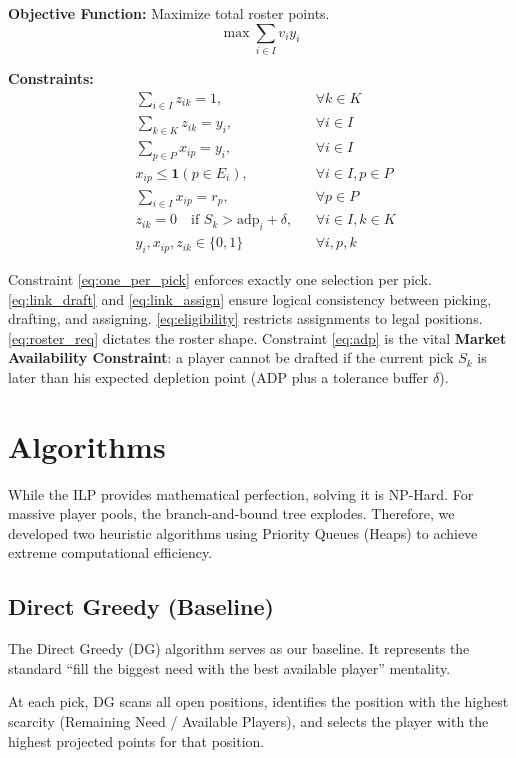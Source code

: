 \documentclass[11pt,a4paper]{article}
\begin{document}
\textbf{Objective Function:} Maximize total roster points.
\[
\max \sum_{i \in I} v_i y_i
\]

\textbf{Constraints:}
\begin{align}
& \sum_{i \in I} z_{ik} = 1, && \forall k \in K \label{eq:one_per_pick} \\
& \sum_{k \in K} z_{ik} = y_i, && \forall i \in I \label{eq:link_draft} \\
& \sum_{p \in P} x_{ip} = y_i, && \forall i \in I \label{eq:link_assign} \\
& x_{ip} \le \mathbf{1}(p \in E_i), && \forall i \in I, p \in P \label{eq:eligibility} \\
& \sum_{i \in I} x_{ip} = r_p, && \forall p \in P \label{eq:roster_req} \\
& z_{ik} = 0 \quad \text{if } S_k > \text{adp}_i + \delta, && \forall i \in I, k \in K \label{eq:adp} \\
& y_i, x_{ip}, z_{ik} \in \{0,1\} && \forall i, p, k
\end{align}

Constraint \eqref{eq:one_per_pick} enforces exactly one selection per pick. \eqref{eq:link_draft} and \eqref{eq:link_assign} ensure logical consistency between picking, drafting, and assigning. \eqref{eq:eligibility} restricts assignments to legal positions. \eqref{eq:roster_req} dictates the roster shape. Constraint \eqref{eq:adp} is the vital \textbf{Market Availability Constraint}: a player cannot be drafted if the current pick $S_k$ is later than his expected depletion point (ADP plus a tolerance buffer $\delta$).

\section{Algorithms}

While the ILP provides mathematical perfection, solving it is NP-Hard. For massive player pools, the branch-and-bound tree explodes. Therefore, we developed two heuristic algorithms using Priority Queues (Heaps) to achieve extreme computational efficiency.

\subsection{Direct Greedy (Baseline)}
The Direct Greedy (DG) algorithm serves as our baseline. It represents the standard ``fill the biggest need with the best available player'' mentality. 

At each pick, DG scans all open positions, identifies the position with the highest scarcity (Remaining Need / Available Players), and selects the player with the highest projected points for that position.
\end{document}
